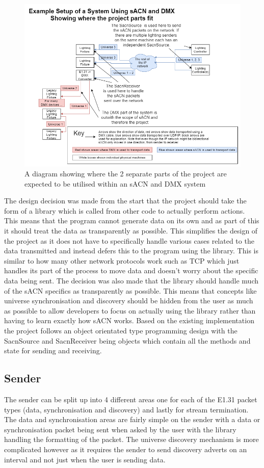 \documentclass[11pt,a4paper]{article}
\begin{document}
\begin{figure}[H]
	\includegraphics[width=\textwidth]{Project-Expected-Usage-Diagram}
	\caption{A diagram showing where the 2 separate parts of the project are expected to be utilised within an sACN and DMX system}
	\label{PROJ_EXPECTED_USAGE}
\end{figure}

The design decision was made from the start that the project should take the form of a library which is called from other code to actually perform actions. This means that the program cannot generate data on its own and as part of this it should treat the data as transparently as possible. This simplifies the design of the project as it does not have to specifically handle various cases related to the data transmitted and instead defers this to the program using the library. This is similar to how many other network protocols work such as TCP which just handles its part of the process to move data and doesn't worry about the specific data being sent. The decision was also made that the library should handle much of the sACN specifics as transparently as possible. This means that concepts like universe synchronisation and discovery should be hidden from the user as much as possible to allow developers to focus on actually using the library rather than having to learn exactly how sACN works. Based on the existing implementation the project follows an object orientated type programming design with the SacnSource and SacnReceiver being objects which contain all the methods and state for sending and receiving.

\subsection{Sender}
The sender can be split up into 4 different areas one for each of the E1.31 packet types (data, synchronisation and discovery) and lastly for stream termination. The data and synchronisation areas are fairly simple on the sender with a data or synchronisation packet being sent when asked by the user with the library handling the formatting of the packet. The universe discovery mechanism is more complicated however as it requires the sender to send discovery adverts on an interval and not just when the user is sending data.
\end{document}

